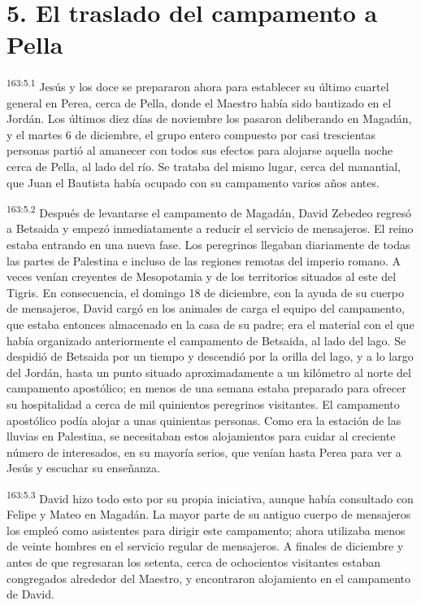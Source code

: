 \section*{5. El traslado del campamento a Pella}
\par 
\textsuperscript{163:5.1} Jesús y los doce se prepararon ahora para establecer su último cuartel general en Perea, cerca de Pella, donde el Maestro había sido bautizado en el Jordán. Los últimos diez días de noviembre los pasaron deliberando en Magadán, y el martes 6 de diciembre, el grupo entero compuesto por casi trescientas personas partió al amanecer con todos sus efectos para alojarse aquella noche cerca de Pella, al lado del río. Se trataba del mismo lugar, cerca del manantial, que Juan el Bautista había ocupado con su campamento varios años antes.

\par 
\textsuperscript{163:5.2} Después de levantarse el campamento de Magadán, David Zebedeo regresó a Betsaida y empezó inmediatamente a reducir el servicio de mensajeros. El reino estaba entrando en una nueva fase. Los peregrinos llegaban diariamente de todas las partes de Palestina e incluso de las regiones remotas del imperio romano. A veces venían creyentes de Mesopotamia y de los territorios situados al este del Tigris. En consecuencia, el domingo 18 de diciembre, con la ayuda de su cuerpo de mensajeros, David cargó en los animales de carga el equipo del campamento, que estaba entonces almacenado en la casa de su padre; era el material con el que había organizado anteriormente el campamento de Betsaida, al lado del lago. Se despidió de Betsaida por un tiempo y descendió por la orilla del lago, y a lo largo del Jordán, hasta un punto situado aproximadamente a un kilómetro al norte del campamento apostólico; en menos de una semana estaba preparado para ofrecer su hospitalidad a cerca de mil quinientos peregrinos visitantes. El campamento apostólico podía alojar a unas quinientas personas. Como era la estación de las lluvias en Palestina, se necesitaban estos alojamientos para cuidar al creciente número de interesados, en su mayoría serios, que venían hasta Perea para ver a Jesús y escuchar su enseñanza.

\par 
\textsuperscript{163:5.3} David hizo todo esto por su propia iniciativa, aunque había consultado con Felipe y Mateo en Magadán. La mayor parte de su antiguo cuerpo de mensajeros los empleó como asistentes para dirigir este campamento; ahora utilizaba menos de veinte hombres en el servicio regular de mensajeros. A finales de diciembre y antes de que regresaran los setenta, cerca de ochocientos visitantes estaban congregados alrededor del Maestro, y encontraron alojamiento en el campamento de David.

